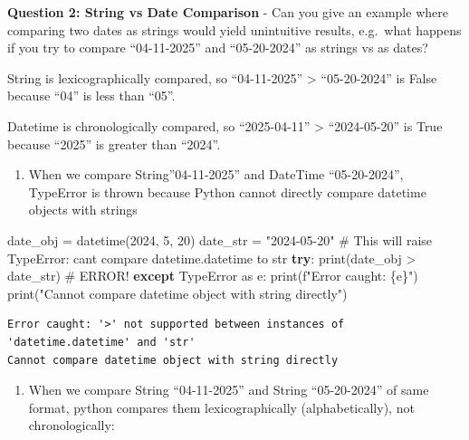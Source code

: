 \documentclass[
]{article}
\newenvironment{Shaded}{\begin{snugshade}}{\end{snugshade}}
\newcommand{\BuiltInTok}[1]{\textcolor[rgb]{0.00,0.23,0.31}{#1}}
\newcommand{\CommentTok}[1]{\textcolor[rgb]{0.37,0.37,0.37}{#1}}
\newcommand{\ControlFlowTok}[1]{\textcolor[rgb]{0.00,0.23,0.31}{\textbf{#1}}}
\newcommand{\DecValTok}[1]{\textcolor[rgb]{0.68,0.00,0.00}{#1}}
\newcommand{\ImportTok}[1]{\textcolor[rgb]{0.00,0.46,0.62}{#1}}
\newcommand{\NormalTok}[1]{\textcolor[rgb]{0.00,0.23,0.31}{#1}}
\newcommand{\OperatorTok}[1]{\textcolor[rgb]{0.37,0.37,0.37}{#1}}
\newcommand{\PreprocessorTok}[1]{\textcolor[rgb]{0.68,0.00,0.00}{#1}}
\newcommand{\SpecialCharTok}[1]{\textcolor[rgb]{0.37,0.37,0.37}{#1}}
\newcommand{\SpecialStringTok}[1]{\textcolor[rgb]{0.13,0.47,0.30}{#1}}
\newcommand{\StringTok}[1]{\textcolor[rgb]{0.13,0.47,0.30}{#1}}
\providecommand{\tightlist}{%
  \setlength{\itemsep}{0pt}\setlength{\parskip}{0pt}}
\begin{document}
\textbf{Question 2: String vs Date Comparison} - Can you give an example
where comparing two dates as strings would yield unintuitive results,
e.g.~what happens if you try to compare ``04-11-2025'' and
``05-20-2024'' as strings vs as dates?

String is lexicographically compared, so ``04-11-2025'' \textgreater{}
``05-20-2024'' is False because ``04'' is less than ``05''.

Datetime is chronologically compared, so ``2025-04-11'' \textgreater{}
``2024-05-20'' is True because ``2025'' is greater than ``2024''.

\begin{enumerate}
\def\labelenumi{\arabic{enumi}.}
\tightlist
\item
  When we compare String''04-11-2025'' and DateTime ``05-20-2024'',
  TypeError is thrown because Python cannot directly compare datetime
  objects with strings
\end{enumerate}

\label{compare-date-string-and-datetime-1}
\begin{Shaded}
\begin{Highlighting}[]
\NormalTok{date\_obj }\OperatorTok{=}\NormalTok{ datetime(}\DecValTok{2024}\NormalTok{, }\DecValTok{5}\NormalTok{, }\DecValTok{20}\NormalTok{)}
\NormalTok{date\_str }\OperatorTok{=} \StringTok{"2024{-}05{-}20"}
\CommentTok{\# This will raise TypeError: can\textquotesingle{}t compare datetime.datetime to str}
\ControlFlowTok{try}\NormalTok{:}
    \BuiltInTok{print}\NormalTok{(date\_obj }\OperatorTok{\textgreater{}}\NormalTok{ date\_str)  }\CommentTok{\# ERROR!}
\ControlFlowTok{except} \PreprocessorTok{TypeError} \ImportTok{as}\NormalTok{ e:}
    \BuiltInTok{print}\NormalTok{(}\SpecialStringTok{f"Error caught: }\SpecialCharTok{\{}\NormalTok{e}\SpecialCharTok{\}}\SpecialStringTok{"}\NormalTok{)}
    \BuiltInTok{print}\NormalTok{(}\StringTok{"Cannot compare datetime object with string directly"}\NormalTok{)}
\end{Highlighting}
\end{Shaded}

\begin{verbatim}
Error caught: '>' not supported between instances of 'datetime.datetime' and 'str'
Cannot compare datetime object with string directly
\end{verbatim}

\begin{enumerate}
\def\labelenumi{\arabic{enumi}.}
\setcounter{enumi}{1}
\tightlist
\item
  When we compare String ``04-11-2025'' and String ``05-20-2024'' of
  same format, python compares them lexicographically (alphabetically),
  not chronologically:
\end{enumerate}
\end{document}
